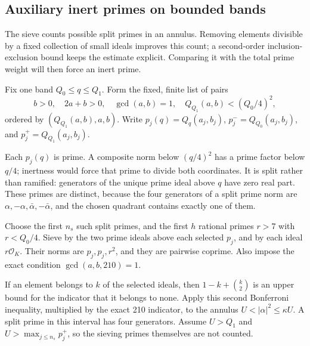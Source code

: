 \documentclass[11pt]{article}
\newcommand{\OK}{\mathcal O_K}
\begin{document}
\subsection{Auxiliary inert primes on bounded bands}\label{sieve}
The sieve counts possible split primes in an annulus. Removing elements
divisible by a fixed collection of small ideals improves this count;
a second-order inclusion-exclusion bound keeps the estimate explicit.
Comparing it with the total prime weight will then force an inert prime.

Fix one band \(Q_0\le q\le Q_1\). Form the fixed, finite list of pairs
\begin{equation}\label{normlist}
 b>0,\quad 2a+b>0,\quad \gcd(a,b)=1,\quad
 Q_{Q_1}(a,b)<(Q_0/4)^2,
\end{equation}
ordered by \((Q_{Q_1}(a,b),a,b)\). Write \(p_j(q)=Q_q(a_j,b_j)\),
\(p_j^-=Q_{Q_0}(a_j,b_j)\), and \(p_j^+=Q_{Q_1}(a_j,b_j)\).

Each \(p_j(q)\) is prime. A composite norm below \((q/4)^2\) has a
prime factor below \(q/4\); inertness would force that prime to divide
both coordinates. It is split rather than ramified: generators of the
unique prime ideal above \(q\) have zero real part. These primes are
distinct, because the four generators of a split prime norm are
\(\alpha,-\alpha,\bar\alpha,-\bar\alpha\), and the chosen quadrant
contains exactly one of them.

Choose the first \(n_s\) such split primes, and the first \(h\) rational
primes \(r>7\) with \(r<Q_0/4\). Sieve by the two prime ideals above
each selected \(p_j\), and by each ideal \(r\OK\). Their norms are
\(p_j,p_j,r^2\), and they are pairwise coprime. Also impose the exact
condition \(\gcd(a,b,210)=1\).

If an element belongs to \(k\) of the selected ideals, then
\(1-k+\binom{k}{2}\) is an upper bound for the indicator that it
belongs to none. Apply this second Bonferroni inequality, multiplied
by the exact 210 indicator, to the annulus
\(U<|\alpha|^2\le\kappa U\). A split prime in this interval has four
generators. Assume \(U>Q_1\) and \(U>\max_{j\le n_s}p_j^+\), so the
sieving primes themselves are not counted.
\end{document}
